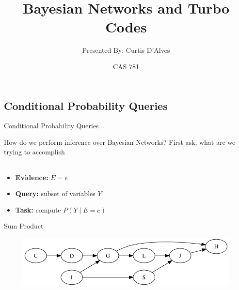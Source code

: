 \documentclass{beamer}
\title{Bayesian Networks and Turbo Codes} %
\subtitle{Presented By: Curtis D'Alves} %
\author{CAS 781}
\begin{document}
  \frame{\maketitle}


  \begin{darkframes}

    \section{Conditional Probability Queries}
    \begin{frame}{Conditional Probability Queries}
        
        How do we perform inference over Bayesian Networks? First ask, what are we trying to accomplish \\
        
        \qquad \\
        
        \begin{itemize}
            \item {\bf Evidence:} \alert{$E = e$}
            \item {\bf Query:} subset of variables \alert{$Y$}
            \item {\bf Task:} compute \alert{$P(Y \mid E = e)$}
        \end{itemize}

    \end{frame}

    \begin{frame}{Sum Product}
        
        \begin{figure}
                    \includegraphics[scale=0.3]{figures/dot_success13}


\end{figure}
\end{frame}
\end{darkframes}
\end{document}
